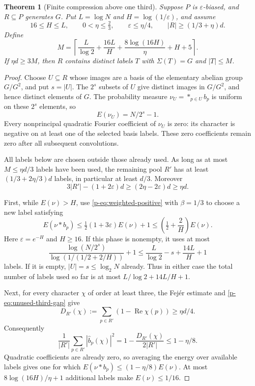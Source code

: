 \documentclass[11pt,a4paper]{article}
\newtheorem{theorem}{Theorem}[section]
\theoremstyle{definition}
\theoremstyle{remark}
\begin{document}
\begin{theorem}[Finite compression above one third]\label{p-thm:finite-compression}
Suppose $P$ is $\varepsilon$-biased, and $R\subseteq P$ generates $G$.
Put $L=\log N$ and $H=\log(1/\varepsilon)$, and assume
\[
 16\leq H\leq L,\qquad
 0<\eta\leq\tfrac23,\qquad
 \varepsilon\leq\eta/4,\qquad
 |R|\geq(1/3+\eta)d.
\]
Define
\[
 M=\left\lceil
 \frac L{\log2}+\frac{16L}{H}
 +\frac{8\log(16H)}{\eta}+H+5
 \right\rceil.
\]
If $\eta d\geq3M$, then $R$ contains distinct labels $T$ with
$\Sigma(T)=G$ and $|T|\leq M$.
\end{theorem}
\begin{proof}
Choose $U\subseteq R$ whose images are a basis of the elementary
abelian group $G/G^2$, and put $s=|U|$.
The $2^s$ subsets of $U$ give distinct images in $G/G^2$, and hence
distinct elements of $G$. The probability measure
$\nu_U=\mathop{*}_{p\in U}b_p$ is uniform on these $2^s$ elements,
so
\[
 E(\nu_U)=N/2^s-1.
\]
Every nonprincipal quadratic Fourier coefficient of $\nu_U$ is zero:
its character is negative on at least one of the selected basis labels.
These zero coefficients remain zero after all subsequent convolutions.

All labels below are chosen outside those already used.
As long as at most $M\leq\eta d/3$ labels have been used, the remaining
pool $R'$ has at least $(1/3+2\eta/3)d$ labels, in particular at least
$d/3$. Moreover
\begin{equation}\label{p-eq:unused-third-gap}
 3|R'|-(1+2\varepsilon)d
 \geq(2\eta-2\varepsilon)d\geq\eta d.
\end{equation}

First, while $E(\nu)>H$, use \eqref{p-eq:weighted-positive} with
$\beta=1/3$ to choose a new label satisfying
\[
 E(\nu*b_p)
 \leq\tfrac12(1+3\varepsilon)E(\nu)+1
 \leq\left(\tfrac12+\frac2H\right)E(\nu).
\]
Here $\varepsilon=e^{-H}$ and $H\geq16$.
If this phase is nonempty, it uses at most
\[
 \frac{\log(N/2^s)}{\log(1/(1/2+2/H))}+1
 \leq\frac L{\log2}-s+\frac{14L}{H}+1
\]
labels. If it is empty, $|U|=s\leq\log_2N$ already.
Thus in either case the total number of labels used so far is at most
$L/\log2+14L/H+1$.

Next, for every character $\chi$ of order at least three, the Fej\'er
estimate and \eqref{p-eq:unused-third-gap} give
\[
 D_{R'}(\chi)
 :=\sum_{p\in R'}(1-\operatorname{Re}\chi(p))\geq\eta d/4.
\]
Consequently
\[
 \frac1{|R'|}\sum_{p\in R'}|\widehat b_p(\chi)|^2
 =1-\frac{D_{R'}(\chi)}{2|R'|}\leq1-\eta/8.
\]
Quadratic coefficients are already zero, so averaging the energy over
available labels gives one for which
$E(\nu*b_p)\leq(1-\eta/8)E(\nu)$.
At most $8\log(16H)/\eta+1$ additional labels make $E(\nu)\leq1/16$.


\end{proof}
\end{document}
